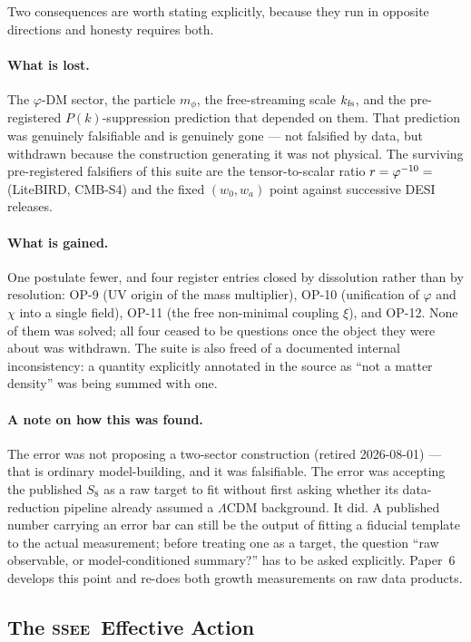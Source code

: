 \documentclass[12pt,a4paper]{article}
\newcommand{\SSEE}{\ifmmode\mathrm{SSEE}\else\textsc{ssee}\fi}
\begin{document}
Two consequences are worth stating explicitly, because they run in opposite
directions and honesty requires both.

\paragraph{What is lost.} The $\varphi$-DM sector, the particle
$m_\phi$, the free-streaming scale $k_{\rm fs}$, and the pre-registered
$P(k)$-suppression prediction that depended on them. That prediction was
genuinely falsifiable and is genuinely gone --- not falsified by data, but
withdrawn because the construction generating it was not physical. The
surviving pre-registered falsifiers of this suite are the tensor-to-scalar
ratio $r=\varphi^{-10}=\val{R_TENSOR_d6}$ (LiteBIRD, CMB-S4) and the fixed
$(w_0,w_a)$ point against successive DESI releases.

\paragraph{What is gained.} One postulate fewer, and four register entries
closed by dissolution rather than by resolution: OP-9 (UV origin of the mass
multiplier), OP-10 (unification of $\varphi$ and $\chi$ into a single field),
OP-11 (the free non-minimal coupling $\xi$), and OP-12. None of them was
solved; all four ceased to be questions once the object they were about was
withdrawn. The suite is also freed of a documented internal inconsistency:
a quantity explicitly annotated in the source as ``not a matter density'' was
being summed with one.

\paragraph{A note on how this was found.} The error was not proposing a
two-sector construction (retired 2026-08-01) --- that is ordinary
model-building, and it was
falsifiable. The error was accepting the published $S_8$ as a raw target to fit
without first asking whether its data-reduction pipeline already assumed a
$\Lambda$CDM background. It did. A published number carrying an error bar can
still be the output of fitting a fiducial template to the actual measurement;
before treating one as a target, the question ``raw observable, or
model-conditioned summary?'' has to be asked explicitly. Paper~6 develops this
point and re-does both growth measurements on raw data products.

\subsection{The \SSEE\ Effective Action}
\label{sec:action}
\end{document}

